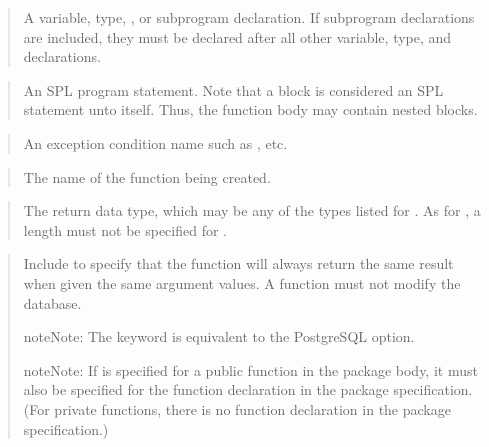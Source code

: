 \documentclass[letterpaper,10pt,english,openany,oneside]{sphinxmanual}
\begin{document}
\begin{quote}

A variable, type, , or subprogram declaration. If subprogram
declarations are included, they must be declared after all other
variable, type, and  declarations.
\end{quote}

\begin{quote}

An SPL program statement. Note that a  block is
considered an SPL statement unto itself. Thus, the function body may
contain nested blocks.
\end{quote}

\begin{quote}

An exception condition name such as , etc.
\end{quote}

\begin{quote}

The name of the function being created.
\end{quote}

\begin{quote}

The return data type, which may be any of the types listed for
. As for , a length must not be specified for
.
\end{quote}

\begin{quote}

Include  to specify that the function will always return
the same result when given the same argument values. A 
function must not modify the database.

\begin{sphinxadmonition}{note}{Note:}
The  keyword is equivalent to the PostgreSQL  option.
\end{sphinxadmonition}

\begin{sphinxadmonition}{note}{Note:}
If  is specified for a public function in the package body, it must also be specified for the function declaration in the package specification. (For private functions, there is no function declaration in the package specification.)
\end{sphinxadmonition}
\end{quote}
\end{document}
